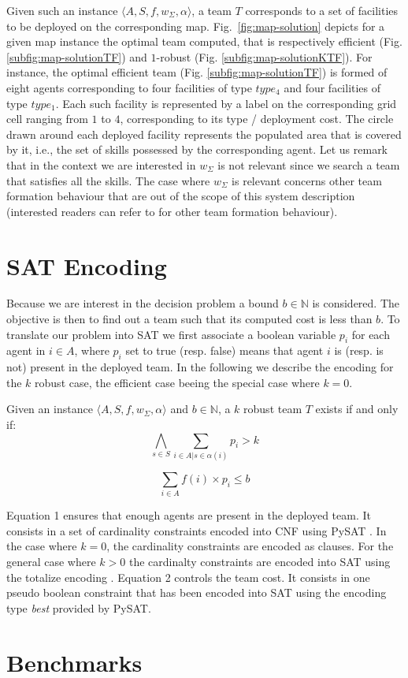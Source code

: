 \documentclass[conference]{IEEEtran}
\theoremstyle{definition}
\begin{document}
Given such an instance $\langle A, S, f, w_\Sigma, \alpha\rangle$, a team $T$ 
corresponds to a set of facilities to be deployed on the corresponding map.
Fig.~\ref{fig:map-solution} depicts for a given map instance the optimal team computed, that is
respectively efficient (Fig. \ref{subfig:map-solutionTF}) and $1$-robust (Fig. \ref{subfig:map-solutionKTF}).
For instance, the optimal efficient team (Fig. \ref{subfig:map-solutionTF}) 
is formed of eight agents corresponding to four facilities
of type $type_4$ and four facilities of type $type_1$. Each such facility 
is represented by a label on the corresponding grid cell
ranging from $1$ to $4$, corresponding to its type / deployment cost. 
The circle drawn around each deployed facility represents the populated area
that is covered by it, i.e., the set of skills possessed by the corresponding agent.
Let us remark that in the context we are interested in $w_\Sigma$ is not relevant since
we search a team that satisfies all the skills. The case where $w_\Sigma$ is relevant 
concerns other team formation behaviour that are out of the scope of this system description
(interested readers can refer to \cite{schwind2021} for other team formation behaviour).

\section{SAT Encoding}

Because we are interest in the decision problem a bound $b \in \mathbb{N}$ is considered.
The objective is then to find out a team such that its computed cost is less than $b$.
To translate our problem into SAT we first associate a boolean 
variable $p_i$ for each agent in $i \in A$, where $p_i$ set to true (resp. false)
means that agent $i$ is (resp. is not) present in the deployed team.
In the following we describe the encoding for the $k$ robust case, the efficient
case beeing the special case where $k=0$.

Given an instance $\langle A, S, f, w_\Sigma, \alpha\rangle$ and $b \in \mathbb{N}$, 
a $k$ robust team $T$ exists if and only if:
\begin{equation}
\bigwedge_{s \in S} \sum_{i \in A | s \in \alpha(i)} p_i > k
\end{equation}

\begin{equation}
\sum_{i \in A} f(i) \times p_i \leq b
\end{equation}

Equation 1 ensures that enough agents are present in the deployed team. 
It consists in a set of cardinality constraints encoded into CNF using PySAT \cite{imms-sat18}.
In the case where $k = 0$, the cardinality constraints are encoded as clauses. 
For the general case where $k > 0$ the cardinalty constraints are encoded into SAT using
the totalize encoding \cite{BailleuxB03}.
Equation 2 controls the team cost. It consists in one pseudo boolean constraint
that has been encoded into SAT using the encoding type \textit{best} provided by PySAT.


\section{Benchmarks}




 

\end{document}
